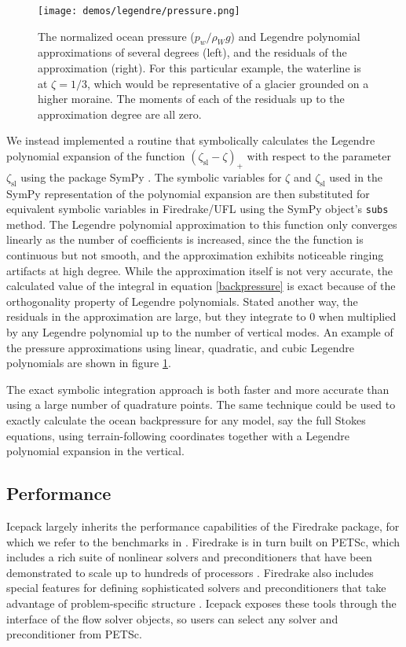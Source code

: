\documentclass[journal abbreviation, manuscript]{copernicus}
\begin{document}
\begin{figure}[h]
    \texttt{[image: demos/legendre/pressure.png]}
    \caption{The normalized ocean pressure ($p_w / \rho_Wg$) and Legendre polynomial approximations of several degrees (left), and the residuals of the approximation (right).
    For this particular example, the waterline is at $\zeta = 1/3$, which would be representative of a glacier grounded on a higher moraine.
    The moments of each of the residuals up to the approximation degree are all zero.}
    \label{fig:legendre}
\end{figure}

We instead implemented a routine that symbolically calculates the Legendre polynomial expansion of the function $(\zeta_{\text{sl}} - \zeta)_+$ with respect to the parameter $\zeta_{\text{sl}}$ using the package SymPy \citep{sympy}.
The symbolic variables for $\zeta$ and $\zeta_{\text{sl}}$ used in the SymPy representation of the polynomial expansion are then substituted for equivalent symbolic variables in Firedrake/UFL using the SymPy object's \texttt{subs} method.
The Legendre polynomial approximation to this function only converges linearly as the number of coefficients is increased, since the the function is continuous but not smooth, and the approximation exhibits noticeable ringing artifacts at high degree.
While the approximation itself is not very accurate, the calculated value of the integral in equation \eqref{backpressure} is exact because of the orthogonality property of Legendre polynomials.
Stated another way, the residuals in the approximation are large, but they integrate to 0 when multiplied by any Legendre polynomial up to the number of vertical modes.
An example of the pressure approximations using linear, quadratic, and cubic Legendre polynomials are shown in figure \ref{fig:legendre}.

The exact symbolic integration approach is both faster and more accurate than using a large number of quadrature points.
The same technique could be used to exactly calculate the ocean backpressure for any model, say the full Stokes equations, using terrain-following coordinates together with a Legendre polynomial expansion in the vertical.

\subsection{Performance}

Icepack largely inherits the performance capabilities of the Firedrake package, for which we refer to the benchmarks in \citet{rathgeber2016firedrake}.
Firedrake is in turn built on PETSc, which includes a rich suite of nonlinear solvers and preconditioners that have been demonstrated to scale up to hundreds of processors \citep{balay2019petsc}.
Firedrake also includes special features for defining sophisticated solvers and preconditioners that take advantage of problem-specific structure \citep{kirby2018solver}.
Icepack exposes these tools through the interface of the flow solver objects, so users can select any solver and preconditioner from PETSc.
\end{document}
